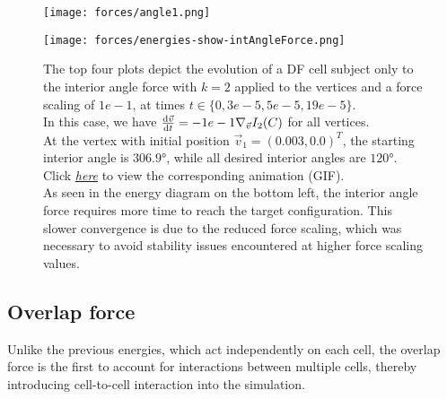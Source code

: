 \begin{figure}[htbp]
	\centering
	\texttt{[image: forces/angle1.png]}\\[1ex]
	\begin{minipage}[c]{0.35\textwidth}
		\texttt{[image: forces/energies-show-intAngleForce.png]}
	\end{minipage}\hfill
	\begin{minipage}[c]{0.6\textwidth}
		\caption{
			The top four plots depict the evolution of a DF cell subject only to the interior angle force with $k=2$ applied to the vertices and a force scaling of $1e-1$, at times $t \in \{0, 3e-5, 5e-5, 19e-5\}$.\\
			In this case, we have $\frac{\mathrm{d} \vec{v}}{\mathrm{d} t} = - 1e-1 \nabla_{\vec{v}} I_2(C)$ for all vertices.\\
			At the vertex with initial position $\vec{v}_1 = (0.003, 0.0)^T$, the starting interior angle is $306.9°$, while all desired interior angles are $120°$.\\
			Click \href{https://github.com/tivo476c/FlexibleCellModel/blob/master/figures/gifs/showForces/show-intAngleForce.gif}{\textit{here}} to view the corresponding animation (GIF).\\
			As seen in the energy diagram on the bottom left, the interior angle force requires more time to reach the target configuration. This slower convergence is due to the reduced force scaling, which was necessary to avoid stability issues encountered at higher force scaling values. 
		} 
		\label{fig:angleForce}
	\end{minipage}
\end{figure}

\subsection{Overlap force}
Unlike the previous energies, which act independently on each cell, the overlap force is the first to account for interactions between multiple cells, thereby introducing cell-to-cell interaction into the simulation. \\

